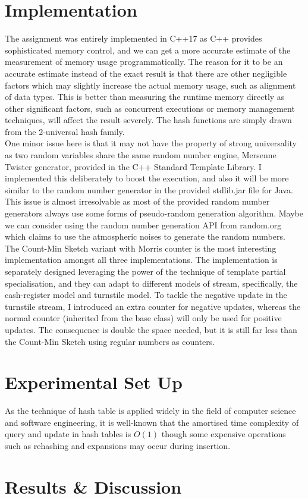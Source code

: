 \documentclass[a4paper, 11pt]{article}
\begin{document}
    \section{Implementation}
        The assignment was entirely implemented in C++17 as C++ provides sophisticated memory control, and we can get a more accurate estimate of the measurement of memory usage programmatically. The reason for it to be an accurate estimate instead of the exact result is that there are other negligible factors which may slightly increase the actual memory usage, such as alignment of data types. This is better than measuring the runtime memory directly as other significant factors, such as concurrent executions or memory management techniques, will affect the result severely. The hash functions are simply drawn from the 2-universal hash family. \\

        \noindent One minor issue here is that it may not have the property of strong universality as two random variables share the same random number engine, Mersenne Twister generator, provided in the C++ Standard Template Library. I implemented this deliberately to boost the execution, and also it will be more similar to the random number generator in the provided stdlib.jar file for Java. This issue is almost irresolvable as most of the provided random number generators always use some forms of pseudo-random generation algorithm. Maybe we can consider using the random number generation API from random.org which claims to use the atmospheric noises to generate the random numbers. \\

        \noindent The Count-Min Sketch variant with Morris counter is the most interesting implementation amongst all three implementations. The implementation is separately designed leveraging the power of the technique of template partial specialisation, and they can adapt to different models of stream, specifically, the cash-register model and turnstile model. To tackle the negative update in the turnstile stream, I introduced an extra counter for negative updates, whereas the normal counter (inherited from the base class) will only be used for positive updates. The consequence is double the space needed, but it is still far less than the Count-Min Sketch using regular numbers as counters.
    \section{Experimental Set Up}
        As the technique of hash table is applied widely in the field of computer science and software engineering, it is well-known that the amortised time complexity of query and update in hash tables is $O \left( 1 \right)$ though some expensive operations such as rehashing and expansions may occur during insertion.
    \section{Results \& Discussion}
\end{document}
